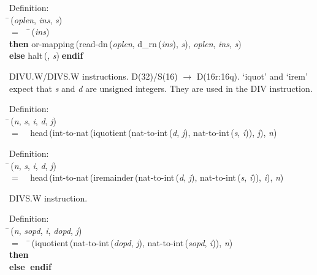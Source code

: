 \begin{tabbing}{\sc Definition}: \\  
\=\,({\it{oplen\/}}, {\it{ins\/}}, {\it{s\/}}) \\ 
$=$$\;\;\;\;$\=\,({\it{ins\/}}) \\ 
{\bf then }{\rm{or-mapping}}\,({\rm{read-dn}}\,({\it{oplen\/}}, {\rm{d\_rn}}\,({\it{ins\/}}), {\it{s\/}}), {\it{oplen\/}}, {\it{ins\/}}, {\it{s\/}}) \\ 
{\bf else }{\rm{halt}}\,({}, {\it{s\/}})$\;${\bf  endif}\-\-
\end{tabbing}

 DIVU.W/DIVS.W instructions.  D(32)/S(16) $\rightarrow$ D(16r:16q).
 `iquot' and `irem' expect that {\it{s\/}} and {\it{d\/}} are unsigned integers.  They are
 used in the DIV instruction.
\begin{tabbing}{\sc Definition}: \\  
\=\,({\it{n\/}}, {\it{s\/}}, {\it{i\/}}, {\it{d\/}}, {\it{j\/}}) \\ 
$=$$\;\;\;\;${\rm{head}}\,({\rm{int-to-nat}}\,({\rm{iquotient}}\,({\rm{nat-to-int}}\,({\it{d\/}}, {\it{j\/}}), {\rm{nat-to-int}}\,({\it{s\/}}, {\it{i\/}})), {\it{j\/}}), {\it{n\/}})\-
\end{tabbing}

\begin{tabbing}{\sc Definition}: \\  
\=\,({\it{n\/}}, {\it{s\/}}, {\it{i\/}}, {\it{d\/}}, {\it{j\/}}) \\ 
$=$$\;\;\;\;${\rm{head}}\,({\rm{int-to-nat}}\,({\rm{iremainder}}\,({\rm{nat-to-int}}\,({\it{d\/}}, {\it{j\/}}), {\rm{nat-to-int}}\,({\it{s\/}}, {\it{i\/}})), {\it{i\/}}), {\it{n\/}})\-
\end{tabbing}

 DIVS.W instruction.
\begin{tabbing}{\sc Definition}: \\  
\=\,({\it{n\/}}, {\it{sopd\/}}, {\it{i\/}}, {\it{dopd\/}}, {\it{j\/}}) \\ 
$=$$\;\;\;\;$\=\,({\rm{iquotient}}\,({\rm{nat-to-int}}\,({\it{dopd\/}}, {\it{j\/}}), {\rm{nat-to-int}}\,({\it{sopd\/}}, {\it{i\/}})), {\it{n\/}}) \\ 
{\bf then }{} \\ 
{\bf else }{}$\;${\bf  endif}\-\-
\end{tabbing}

